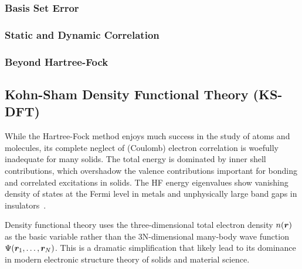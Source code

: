 \subsubsection{Basis Set Error}

\subsubsection{Static and Dynamic Correlation}

\subsubsection{Beyond Hartree-Fock}

\begin{comment}
\begin{align}
\chi_{nlm}(r, \theta, \phi;\zeta) \equiv \dfrac{(2\zeta)^{n+1/2}}{\sqrt{(2n)!}}
r^{n-1}e^{-\zeta r} Y_{lm}(\theta, \phi).
\end{align}
\begin{align}
g(r; \sigma) = \dfrac{1}{\sigma\sqrt{2\pi}} e^{-\dfrac{r^2}{2\sigma^2}}.
\end{align}
\end{comment}

\subsection{Kohn-Sham Density Functional Theory (KS-DFT)}
While the Hartree-Fock method enjoys much success in the study of atoms and molecules, its complete neglect of (Coulomb) electron correlation is woefully inadequate for many solids. The total energy is dominated by inner shell contributions, which overshadow the valence contributions important for bonding and correlated excitations in solids. The HF energy eigenvalues show vanishing density of states at the Fermi level in metals and unphysically large band gaps in insulators~\cite{Perdew1981}.

Density functional theory uses the three-dimensional total electron density $n(\boldsymbol{r})$ as the basic variable rather than the 3N-dimensional many-body wave function $\Psi(\boldsymbol{r}_1,\dots,\boldsymbol{r}_N)$. This is a dramatic simplification that likely lead to its dominance in modern electronic structure theory of solids and material science.

